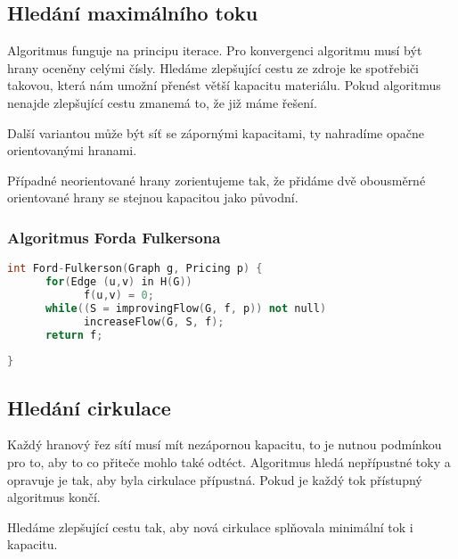 \documentclass[12pt]{article}
\begin{document}
\subsection{Hledání maximálního toku}
Algoritmus funguje na principu iterace. Pro konvergenci algoritmu musí být hrany oceněny celými čísly. Hledáme zlepšující cestu ze zdroje ke spotřebiči takovou, která nám umožní přenést větší kapacitu materiálu.
Pokud algoritmus nenajde zlepšující cestu zmanemá to, že již máme řešení.

Další variantou může být síť se zápornými kapacitami, ty nahradíme opačne orientovanými hranami.

Případné neorientované hrany zorientujeme tak, že přidáme dvě obousměrné orientované hrany se stejnou kapacitou jako původní.

\subsubsection{Algoritmus Forda Fulkersona}
\begin{lstlisting}[language=c++]
int Ford-Fulkerson(Graph g, Pricing p) {
      for(Edge (u,v) in H(G))  
            f(u,v) = 0; 
      while((S = improvingFlow(G, f, p)) not null) 
            increaseFlow(G, S, f);
      return f;
      
}
\end{lstlisting}

\subsection{Hledání cirkulace}
Každý hranový řez sítí musí mít nezápornou kapacitu, to je nutnou podmínkou pro to, aby to co přiteče mohlo také odtéct. Algoritmus hledá nepřípustné toky a opravuje je tak, aby byla cirkulace přípustná. Pokud je každý tok přístupný algoritmus končí.

Hledáme zlepšující cestu tak, aby nová cirkulace splňovala minimální tok i kapacitu.
\cleardoublepage

\tableofcontents
\end{document}
